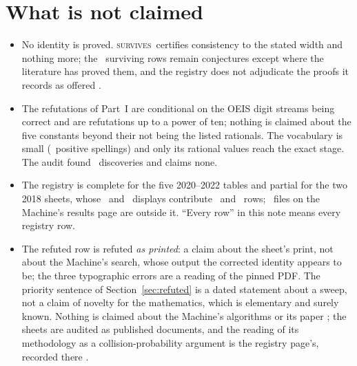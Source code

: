 \documentclass[11pt]{article}
\theoremstyle{definition}
\theoremstyle{plain}
\newcommand{\vS}{\textsc{survives}}
\begin{document}
\section{What is not claimed}

\begin{itemize}\setlength{\itemsep}{1pt}
\item No identity is proved. \vS\ certifies consistency to the stated width and nothing more; the \RmSurvive\ surviving rows remain conjectures except where the literature has proved them, and the registry does not adjudicate the proofs it records as offered \cite{KO21,Sh26}.
\item The refutations of Part~I are conditional on the OEIS digit streams being correct and are refutations up to a power of ten; nothing is claimed about the five constants beyond their not being the listed rationals. The vocabulary is small (\FormsTested\ positive spellings) and only its rational values reach the exact stage. The audit found \OeisHits\ discoveries and claims none.
\item The registry is complete for the five 2020--2022 tables and partial for the two 2018 sheets, whose \EDisplays\ and \PiDisplays\ displays contribute \ERows\ and \PiRows\ rows; \RmOutside\ files on the Machine's results page are outside it. ``Every row'' in this note means every registry row.
\item The refuted row is refuted \emph{as printed}: a claim about the sheet's print, not about the Machine's search, whose output the corrected identity appears to be; the three typographic errors are a reading of the pinned PDF. The priority sentence of Section~\ref{sec:refuted} is a dated statement about a sweep, not a claim of novelty for the mathematics, which is elementary and surely known. Nothing is claimed about the Machine's algorithms or its paper \cite{RM21}; the sheets are audited as published documents, and the reading of its methodology as a collision-probability argument is the registry page's, recorded there \cite{repo}.
\end{itemize}
\end{document}
